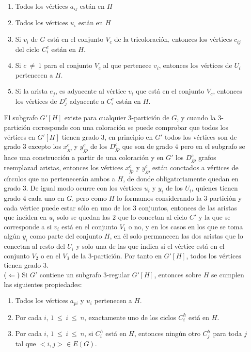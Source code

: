 \documentclass{article}
\begin{document}
\begin{enumerate}
    \item Todos los v\'ertices $a_{ij}$ est\'an en $H$
    \item Todos los v\'ertices $u_{i}$ est\'an en $H$
    \item Si $v_i$ de $G$ est\'a en el conjunto $V_c$ de la tricoloraci\'on, entonces los v\'ertices $c_{ij}$ del ciclo $C_i^c$ est\'an en $H$.
    \item Si $c ~\neq ~1$ para el conjunto $V_c$ al que pertenece $v_i$, entonces los v\'ertices de $U_i$ pertenecen a $H$.
    \item Si la arista $e_j$, es adyacente al v\'ertice $v_i$ que est\'a en el conjunto $V_c$, entonces los v\'ertices de $D_j^c$ adyacente a $C_i^c$ est\'an en $H$.
\end{enumerate}
    El subgrafo $G'[H]$ existe para cualquier $3$-partici\'on de $G$, y cuando la $3$-partici\'on corresponde con una 
    coloraci\'on se puede comprobar que todos los v\'ertices en $G'[H]$ tienen grado $3$, en principio en $G'$ todos los v\'ertices son de grado $3$ excepto los 
    $x_{jp}^c$ y $y_{jp}^c$ de los $D_{jp}^c$ que son de grado $4$ pero en el subgrafo se hace una construcci\'on a partir de una coloraci\'on y en $G'$ los $D_{jp}^c$ grafos reemplazad aristas, 
    entonces los v\'ertices $x_{jp}^c$ y $y_{jp}^c$ est\'an conctados a v\'ertices de c\'irculos que no pertenecer\'an ambos a $H$, de donde obligatoriamente quedan en grado $3$. De igual modo ocurre con los v\'ertices $u_i$ y $y_i$ de los $U_i$, quienes tienen 
    grado $4$ cada uno en $G$, pero como $H$ lo formamos considerando la $3$-partici\'on y cada v\'ertice puede estar s\'olo en uno de los $3$ conjuntos, entonces de las aristas que inciden en $u_i$ solo se quedan las $2$ que lo conectan al ciclo $C'$ y la que se corresponde a si $v_i$ 
    est\'a en el conjunto $V_1$ o no, y en los casos en los que se toma alg\'un $y_i$ como parte del conjunto $H$, en \'el solo permanecen las dos aristas que lo conectan al resto del $U_i$ y solo una de las que indica si el v\'ertice est\'a en el conjunto $V_2$ o en el $V_3$ de la $3$-partici\'on. 
    Por tanto en $G'[H]$, todos los v\'ertices tienen grado $3$.\\ 

($\Leftarrow$) Si $G'$ contiene un subgrafo $3$-regular $G'[H]$, entonces sobre $H$ se cumplen las siguientes propiedades:\\ 

\begin{enumerate}
    \item Todos los v\'ertices $a_{pi}$ y $u_i$ pertenecen a $H$.
    \item Por cada $i$, $1~ \leq~i~\leq ~n$, exactamente uno de los ciclos $C_i^{h}$ est\'a en $H$.
    \item Por cada $i$, $1~ \leq~i~\leq ~n$, si $C_i^{h}$ est\'a en $H$, entonces ning\'un otro $C_j^{h}$ para toda $j$ tal que $<i,j> \in E(G)$.
\end{enumerate}
\end{document}
